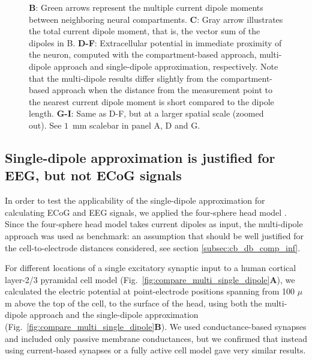 \documentclass[preprint,10pt,authoryear]{elsarticle}
\newcommand{\hlp}[2][Purple]{ {\sethlcolor{#1} \hl{#2}} }
\newcommand{\gen}[1]{\color{white}{\hlp{GTE: #1 }}\color{black}}
\begin{document}
\begin{figure}[H]
{%
		\textbf{B}: Green arrows represent the multiple current dipole moments between neighboring neural compartments.
		\textbf{C}: Gray arrow illustrates the total current dipole moment, that is, the vector sum of the dipoles in B.
	\textbf{D-F}: Extracellular potential in immediate proximity of the neuron, computed with the compartment-based approach, multi-dipole approach and single-dipole approximation, respectively. Note that the multi-dipole results differ slightly from the compartment-based approach when the distance from the measurement point to the nearest current dipole moment is short compared to the dipole length.
\textbf{G-I}: Same as D-F, but at a larger spatial scale (zoomed out). See $1$~mm scalebar in panel A, D and G.
}
\label{fig:dipole_field}
\end{figure}


\subsection{Single-dipole approximation is justified for EEG, but not ECoG signals}\label{subsec:cb_db_comp_4s}

In order to test the applicability of the single-dipole approximation for calculating ECoG and EEG signals, we applied the four-sphere head model \citep{NAESS2017, HAGEN2018, HAGEN2019}.
Since the four-sphere head model takes current dipoles as input, the multi-dipole approach was used as benchmark: an assumption that should be well justified for the cell-to-electrode distances considered, see section \ref{subsec:cb_db_comp_inf}.

For different locations of a single excitatory synaptic input to a human cortical layer-2/3 pyramidal cell model \citep{EYAL2016}
(Fig.~\ref{fig:compare_multi_single_dipole}\textbf{A}), we calculated the electric potential at point-electrode positions spanning from 100 $\mu$m above the top of the cell, to the surface of the head, using both the multi-dipole approach and the single-dipole approximation (Fig.~\ref{fig:compare_multi_single_dipole}\textbf{B}). 
We used conductance-based synapses and included only passive membrane conductances, but we confirmed that instead using current-based synapses or a fully active cell model gave very similar results.  
\end{document}
